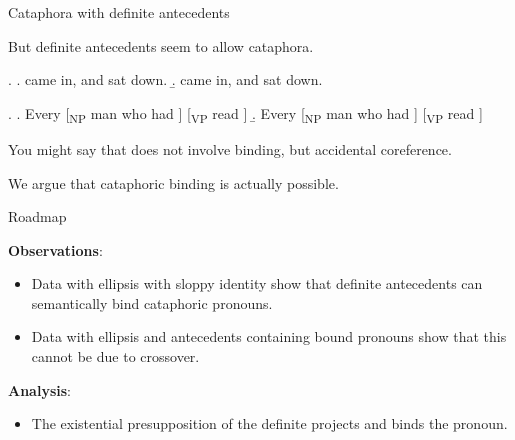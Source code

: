 \documentclass{beamer}
\begin{document}
\begin{frame}{Cataphora with definite antecedents}

But definite antecedents seem to allow cataphora.

\ex.
  \a.  came in, and  sat down.
  \b.  came in, and  sat down.

\medskip

\ex.
  \a. Every [\textsubscript{NP} man who had ] [\textsubscript{VP} read ]
  \b. Every [\textsubscript{NP} man who had ] [\textsubscript{VP} read ]

You might say that \Last[b] does not involve binding, but \alert{accidental coreference}.

We argue that cataphoric binding is actually possible.


\end{frame}

\begin{frame}{Roadmap}

{\bf Observations}:
\begin{itemize}
  \item Data with \alert{ellipsis with sloppy identity} show that definite antecedents can semantically bind cataphoric pronouns.
  \item Data with ellipsis and antecedents containing bound pronouns show that this cannot be due to \alert{crossover}.
\end{itemize}

{\bf Analysis}:
\begin{itemize}
  \item The existential presupposition of the definite projects and binds the pronoun.
\end{itemize}

\end{frame}
\end{document}
